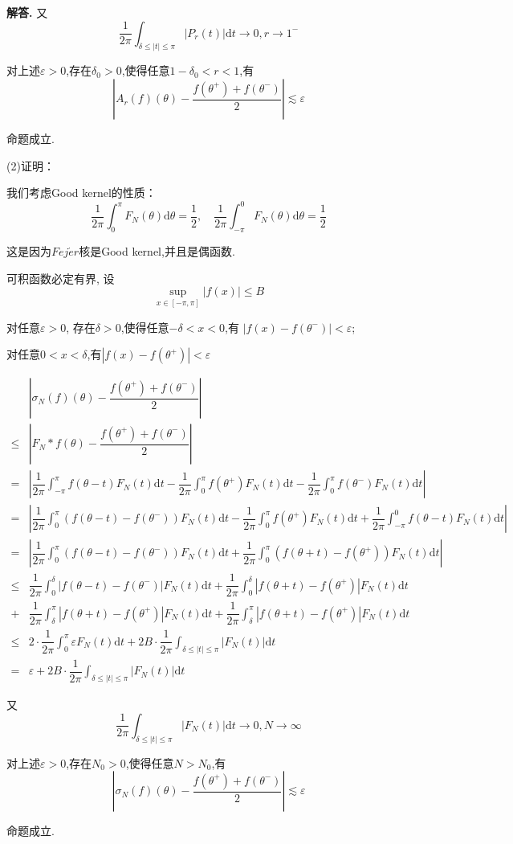 \documentclass[12pt, a4paper, oneside]{ctexart}
\newenvironment{solution}{\par\noindent\textbf{解答. }}{\par}
\begin{document}
\begin{solution}
又$$
\dfrac{1}{2\pi}\int_{\delta \leqslant |t| \leqslant \pi}|P_r(t)|\mathrm{d}t \to 0, r \to 1^- 
$$
\par
对上述$\varepsilon>0$,存在$\delta_0>0$,使得任意$1-\delta_0<r<1$,有
$$
\left|A_r(f)(\theta)-\dfrac{f(\theta^+)+f(\theta^-)}{2}\right|\lesssim \varepsilon
$$
\par
命题成立.
\par
\quad
\par
(2)证明：
\par
我们考虑Good kernel的性质：
$$
\dfrac{1}{2\pi}\int_{0}^{\pi}F_N(\theta)\mathrm{d}\theta=\dfrac{1}{2}, 
\quad\dfrac{1}{2\pi}\int_{-\pi}^{0}F_N(\theta)\mathrm{d}\theta=\dfrac{1}{2}
$$
\par
这是因为$Fej\acute{e}r$核是Good kernel,并且是偶函数.
\par
可积函数必定有界, 设
$$
\sup_{x\in[-\pi,\pi]}|f(x)|\leqslant B
$$
\par
对任意$\varepsilon>0$, 存在$\delta>0$,使得任意$-\delta<x<0$,有
$|f(x)-f(\theta^-)|<\varepsilon$;
\par
对任意$0<x<\delta$,有$|f(x)-f(\theta^+)|<\varepsilon$
\par
$$
\begin{aligned}
&\left|\sigma_N(f)(\theta)-\dfrac{f(\theta^+)+f(\theta^-)}{2}\right|\\
\leqslant&\left|F_N*f(\theta)-\dfrac{f(\theta^+)+f(\theta^-)}{2}\right|\\
=&\left|
\dfrac{1}{2\pi}\int_{-\pi}^{\pi}f(\theta-t)F_N(t)\mathrm{d}t
-\dfrac{1}{2\pi}\int_{0}^{\pi}f(\theta^+)F_N(t)\mathrm{d}t
-\dfrac{1}{2\pi}\int_{0}^{\pi}f(\theta^-)F_N(t)\mathrm{d}t
\right|\\
=&\left|
\dfrac{1}{2\pi}\int_{0}^{\pi}(f(\theta-t)-f(\theta ^-))F_N(t)\mathrm{d}t
-\dfrac{1}{2\pi}\int_{0}^{\pi}f(\theta^+)F_N(t)\mathrm{d}t
+\dfrac{1}{2\pi}\int_{-\pi}^{0}f(\theta-t)F_N(t)\mathrm{d}t\right|\\
=&\left|\dfrac{1}{2\pi}\int_{0}^{\pi}(f(\theta-t)-f(\theta ^-))F_N(t)\mathrm{d}t
+\dfrac{1}{2\pi}\int_{0}^{\pi}(f(\theta+t)-f(\theta ^+))F_N(t)\mathrm{d}t\right|\\
\leqslant&\dfrac{1}{2\pi}\int_{0}^{\delta}|f(\theta-t)-f(\theta^-)|F_N(t)\mathrm{d}t
+\dfrac{1}{2\pi}\int_{0}^{\delta}|f(\theta+t)-f(\theta^+)|F_N(t)\mathrm{d}t\\
+&\dfrac{1}{2\pi}\int_{\delta}^{\pi}|f(\theta+t)-f(\theta^+)|F_N(t)\mathrm{d}t
+\dfrac{1}{2\pi}\int_{\delta}^{\pi}|f(\theta+t)-f(\theta^+)|F_N(t)\mathrm{d}t\\
\leqslant&2\cdot\dfrac{1}{2\pi}\int_{0}^{\pi}\varepsilon F_N(t)\mathrm{d}t
+2B\cdot \dfrac{1}{2\pi}\int_{\delta \leqslant |t| \leqslant \pi}|F_N(t)|\mathrm{d}t\\
=&\varepsilon+2B\cdot \dfrac{1}{2\pi}\int_{\delta \leqslant |t| \leqslant \pi}|F_N(t)|\mathrm{d}t
\end{aligned}
$$
\par
又$$
\dfrac{1}{2\pi}\int_{\delta \leqslant |t| \leqslant \pi}|F_N(t)|\mathrm{d}t \to 0, N \to \infty 
$$
\par
对上述$\varepsilon>0$,存在$N_0>0$,使得任意$N>N_0$,有
$$
\left|\sigma_N(f)(\theta)-\dfrac{f(\theta^+)+f(\theta^-)}{2}\right|\lesssim \varepsilon
$$
\par
命题成立.
\end{solution}
\end{document}
